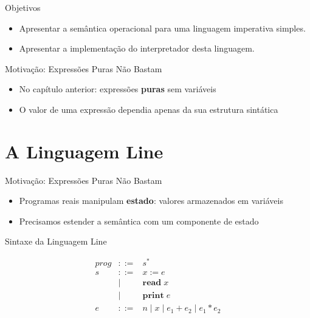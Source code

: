 \subtitle{\bf Aula 13 - A Linguagem Line}
\begin{frame}[t,plain]
    \titlepage
\end{frame}

\begin{frame}{Objetivos}

    \begin{itemize}
        \item
        Apresentar a semântica operacional para uma linguagem imperativa
        simples.
        \item
        Apresentar a implementação do interpretador desta linguagem.
    \end{itemize}
\end{frame}



\begin{frame}{Motivação: Expressões Puras Não Bastam}

    \begin{itemize}

        \item
        No capítulo anterior: expressões \textbf{puras} sem variáveis
        \item
        O valor de uma expressão dependia apenas da sua estrutura sintática
    \end{itemize}
\end{frame}


\section{A Linguagem Line}\label{a-linguagem-line-1}

\begin{frame}{Motivação: Expressões Puras Não Bastam}

    \begin{itemize}

        \item
        Programas reais manipulam \textbf{estado}: valores armazenados em
        variáveis
        \item
        Precisamos estender a semântica com um componente de estado
    \end{itemize}
\end{frame}

\begin{frame}{Sintaxe da Linguagem Line}

    \[\begin{array}{lcl}
    \mathit{prog} &::=& s^* \\[4pt]
    s &::=& x \mathbin{:=} e \\
    &\mid& \mathbf{read}\; x \\
    &\mid& \mathbf{print}\; e \\[4pt]
    e &::=& n \mid x \mid e_1 + e_2 \mid e_1 * e_2
\end{array}\]
\end{frame}

